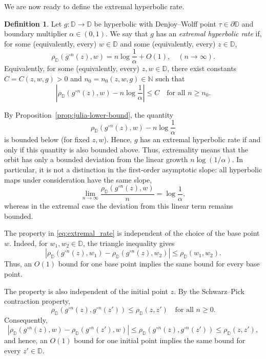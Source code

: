 \documentclass[12pt]{amsart}
\numberwithin{equation}{section}
\theoremstyle{plain}
\theoremstyle{definition}
\newtheorem{definition}[equation]{Definition}
\begin{document}
We are now ready to define the extremal hyperbolic rate.

\begin{definition}
\label{def:extremal_rate}
Let $g:\mathbb{D}\to\mathbb{D}$ be hyperbolic with Denjoy--Wolff point
$\tau\in\partial\mathbb{D}$ and boundary multiplier
$\alpha\in(0,1)$. We say that $g$ has an
\emph{extremal hyperbolic rate} if, for some (equivalently, every)
$w\in\mathbb{D}$ and some (equivalently, every) $z\in\mathbb{D}$,
\begin{equation}
\label{eq:extremal_rate}
\rho_{\mathbb{D}}(g^{\circ n}(z),w)
=
n\log\frac{1}{\alpha}+O(1),
\quad (n\to\infty).
\end{equation}
Equivalently, for some (equivalently, every) $z,w\in\mathbb{D}$,
there exist constants $C=C(z,w,g)>0$ and
$n_0=n_0(z,w,g)\in\mathbb{N}$ such that
\begin{equation*}
\left|
\rho_{\mathbb{D}}(g^{\circ n}(z),w)
-
n\log\frac{1}{\alpha}
\right|
\le C
\quad\text{for all }n\ge n_0.
\end{equation*}

By Proposition~\ref{prop:julia-lower-bound}, the quantity
\begin{equation*}
\rho_{\mathbb{D}}(g^{\circ n}(z),w)
-
n\log\frac{1}{\alpha}
\end{equation*}
is bounded below (for fixed $z,w$). Hence, $g$ has an extremal
hyperbolic rate if and only if this quantity is also bounded above.
Thus, extremality means that the orbit has only a bounded deviation
from the linear growth $n\log(1/\alpha)$. In particular, it is not a
distinction in the first-order asymptotic slope: all hyperbolic maps
under consideration have the same slope,
\begin{equation*}
\lim_{n\to\infty}
\frac{\rho_{\mathbb{D}}(g^{\circ n}(z),w)}{n}
=
\log\frac{1}{\alpha},
\end{equation*}
whereas in the extremal case the deviation from this linear term
remains bounded.

The property in \eqref{eq:extremal_rate} is independent of the choice
of the base point $w$. Indeed, for $w_1,w_2\in\mathbb{D}$, the triangle
inequality gives
\begin{equation*}
\left|
\rho_{\mathbb{D}}(g^{\circ n}(z),w_1)
-
\rho_{\mathbb{D}}(g^{\circ n}(z),w_2)
\right|
\le
\rho_{\mathbb{D}}(w_1,w_2).
\end{equation*}
Thus, an $O(1)$ bound for one base point implies the same bound for every base point.

The property is also independent of the initial point $z$. By the
Schwarz--Pick contraction property,
\begin{equation*}
\rho_{\mathbb{D}}(g^{\circ n}(z),g^{\circ n}(z'))
\le
\rho_{\mathbb{D}}(z,z')
\quad\text{for all }n\ge0.
\end{equation*}
Consequently,
\begin{equation*}
\left|
\rho_{\mathbb{D}}(g^{\circ n}(z),w)
-
\rho_{\mathbb{D}}(g^{\circ n}(z'),w)
\right|
\le
\rho_{\mathbb{D}}(g^{\circ n}(z),g^{\circ n}(z'))
\le
\rho_{\mathbb{D}}(z,z'),
\end{equation*}
and hence, an $O(1)$ bound for one initial point implies the same
bound for every $z'\in\mathbb{D}$.
\end{definition}
\end{document}
